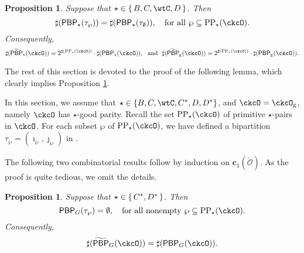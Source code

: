 \documentclass[12pt,a4paper]{amsart}
\def\subset{\subseteq}
\newcommand{\CO}{{\mathcal {O}}}
\numberwithin{equation}{section}
\newtheorem{prop}[thm]{Proposition}
\theoremstyle{remark}
\def\CPPs{\mathrm{PP}_{\star}}
\def\tPBP{\widetilde{\mathsf{PBP}}}
\def\PBP{\mathsf{PBP}}
\def\ckcOg{\ckcO_{\mathrm g}}
\def\tPBP{\widetilde{\mathsf{PBP}}}
\begin{document}
{%



    \smallskip


\begin{prop} \label{prop:PBP} Suppose that   $\star\in \set{B,C,\wtC,D}$. Then
  \[
    \sharp(\PBP_{\star}(\tau_{\wp})) = \sharp(\PBP_{\star}(\tau_{\emptyset})), \quad \textrm{for all } \wp \subseteq \CPPs(\ckcO).
  \]
 Consequently,
  \[
    \sharp(\tPBP_{\star}(\ckcO)) = 2^{\sharp(\CPPs(\ckcO))}\cdot \sharp(\PBP_{\star}(\ckcO)), \,\, \text{ and } \,\, \sharp(\tPBP_{\mathrm g}(\ckcO)) = 2^{\sharp(\CPPs(\ckcO))}\cdot \sharp(\PBP_{\mathrm g}(\ckcO)).
  \]
\end{prop}

The rest of this section is devoted to the proof of the following lemma, which clearly implies Proposition \ref{prop:PBP}.
}

In this section, we assume that $\star \in \{B,C,\wtC,C^{*},D,D^{*}\}$, and $\ckcO = \ckcOg$, namely $\ckcO $ has $\star$-good parity.
Recall the set  $\CPPs(\ckcO)$ of primitive $\star$-pairs in $\ckcO$. For each subset $\wp$ of $\CPPs(\ckcO)$, we have defined a bipartition $\tau_{\wp}=(\imath_{\wp},\jmath_{\wp})$ in .

The following two combinatorial results follow by induction on $\mathbf c_1(\check \CO)$. As the proof is quite tedious, we omit the details.
\begin{prop} \label{prop:PBP1} Suppose that $\star\in \set{C^{*}, D^{*}}$. Then
\[
    \PBP_{G}(\tau_{\wp}) = \emptyset, \quad \text{for all nonempty $\wp\subset \CPPs(\ckcO)$.}
  \]
 Consequently,
     \[
     \sharp(\tPBP_{G}(\ckcO)) = \sharp(\PBP_{G}(\ckcO)).
  \]
\end{prop}
\end{document}
